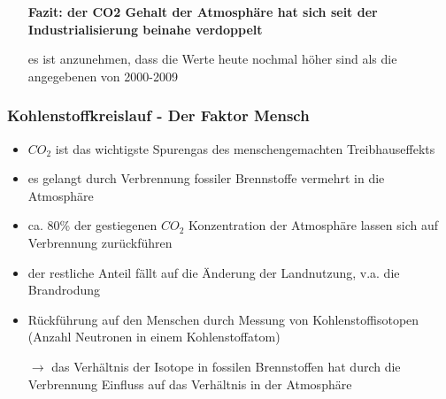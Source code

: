\begin{frame}
{\begin{itemize}
			\item[] \textbf{Fazit: der CO2 Gehalt der Atmosphäre hat sich seit der Industrialisierung beinahe verdoppelt}
			\item[] es ist anzunehmen, dass die Werte heute nochmal höher sind als die angegebenen von 2000-2009
		\end{itemize}
	}
\end{frame}

\begin{frame}
	\frametitle{Kohlenstoffkreislauf - Der Faktor Mensch}
	\begin{itemize}
		\item $CO_2$ ist das wichtigste Spurengas des menschengemachten Treibhauseffekts
		\item es gelangt durch Verbrennung fossiler Brennstoffe vermehrt in die Atmosphäre
		\item ca. 80\% der gestiegenen $CO_2$ Konzentration der Atmosphäre lassen sich auf Verbrennung zurückführen
		\item der restliche Anteil fällt auf die Änderung der Landnutzung, v.a. die Brandrodung
		\item Rückführung auf den Menschen durch Messung von Kohlenstoffisotopen (Anzahl Neutronen in einem Kohlenstoffatom)
		\item [$\rightarrow$] das Verhältnis der Isotope in fossilen Brennstoffen hat durch die Verbrennung Einfluss auf das Verhältnis in der Atmosphäre
	\end{itemize}

\end{frame}


